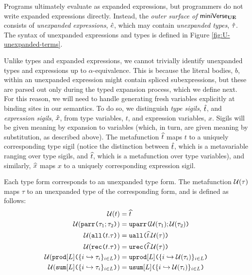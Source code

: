 Programs ultimately evaluate as expanded expressions, but programmers do not write expanded expressions directly. Instead, the \emph{outer surface of} $\mathsf{miniVerse}_\textbf{UE}$ consists of \emph{unex\-panded expressions}, ${\hat e}$, which may contain \emph{unexpanded types}, ${\hat\tau}$. The syntax of unexpanded expressions and types is defined in Figure \ref{fig:U-unexpanded-terms}. 

Unlike types and expanded expressions, we cannot trivially identify unexpanded types and expressions up to $\alpha$-equivalence. This is because the literal bodies, $b$, within an unexpanded expression might contain spliced subexpressions, but these are parsed out only during the typed expansion process, which we define next. %
For this reason, we will need to handle generating fresh variables explicitly at binding sites in our semantics. To do so, we distinguish \emph{type sigils}, ${\hat{t}}$, and \emph{expression sigils}, ${\hat x}$, from type variables, $t$, and expression variables, $x$. Sigils will be given meaning by expansion to variables (which, in turn, are given meaning by substitution, as described above). The metafunction $\widehat{t}$ maps $t$ to a uniquely corresponding type sigil (notice the distinction between ${\hat{t}}$, which is a metavariable ranging over type sigils, and $\widehat{t}$, which is a metafunction over type variables), and similarly, $\widehat{x}$ maps $x$ to a uniquely corresponding expression sigil.

Each type form corresponds to an unexpanded type form. The metafunction $\mathcal{U}(\tau)$ maps $\tau$ to an unexpanded type of the corresponding form, and is defined as follows: 
  \begin{align*}
  \mathcal{U}(t) &= \widehat{t}\\
  \mathcal{U}(\texttt{parr}\texttt{(}\tau_1; \tau_2\texttt{)}) & = \texttt{uparr}\texttt{(}\mathcal{U}(\tau_1); \mathcal{U}(\tau_2)\texttt{)}\\
  \mathcal{U}(\texttt{all}\texttt{(}t.\tau\texttt{)}) & = \texttt{uall}\texttt{(}\widehat{t}.\mathcal{U}(\tau)\texttt{)}\\
  \mathcal{U}(\texttt{rec}\texttt{(}t.\tau\texttt{)}) & = \texttt{urec}\texttt{(}\widehat{t}.\mathcal{U}(\tau)\texttt{)}\\
  \mathcal{U}(\texttt{prod}[L]\texttt{(}\{i \hookrightarrow \tau_{i}\}_{i \in L}\texttt{)}) & = \texttt{uprod}[L]\texttt{(}\{i \hookrightarrow \mathcal{U}(\tau_{i})\}_{i \in L}\texttt{)}\\
  \mathcal{U}(\texttt{sum}[L]\texttt{(}\{i \hookrightarrow \tau_{i}\}_{i \in L}\texttt{)}) & = \texttt{usum}[L]\texttt{(}\{i \hookrightarrow \mathcal{U}(\tau_{i})\}_{i \in L}\texttt{)}
  \end{align*}

